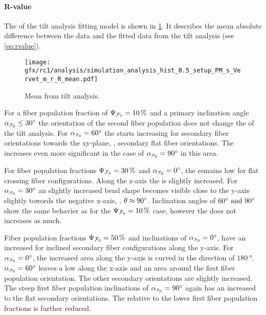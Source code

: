 \paragraph{R-value}
% 
The \rvalue{} of the tilt analysis fitting model is shown in \cref{fig:sim_ana_rvalue}.
It describes the mean absolute difference between the data and the fitted data from the tilt analysis (see \cref{eq:rvalue}).
\par
% 
\begin{figure}[!p]
\centering
\texttt{[image: gfx/rc1/analysis/simulation\_analysis\_hist\_0.5\_setup\_PM\_s\_Vervet\_m\_r\_R\_mean.pdf]}
\caption{Mean \rvalue{} from tilt analysis.}
\label{fig:sim_ana_rvalue}
\end{figure}
%
For a fiber population fraction of $\textnormal{$\Psi_{\textnormal{$\mathcal{F}_0$}}$}=\SI{10}{\percent}$ and a primary inclination angle $\modelInc\leq\SI{30}{\degree}$ the orientation of the second fiber population does not change the \rvalue{} of the tilt analysis.
For $\modelInc=\SI{60}{\degree}$ the \rvalue{} starts increasing for secondary fiber orientations towards the xy-plane, \ie{}, secondary flat fiber orientations.
The \rvalue{} increases even more significant in the case of $\modelInc=\SI{90}{\degree}$ in this area. 
\par
% 
For fiber population fractions $\textnormal{$\Psi_{\textnormal{$\mathcal{F}_0$}}$}=\SI{30}{\percent}$ and $\modelInc=\SI{0}{\degree}$, the \rvalue{} remains low for flat crossing fiber configurations.
Along the z-axis the \rvalue{} is slightly increased.
For $\modelInc=\SI{30}{\degree}$ an slightly increased bend shape becomes visible close to the y-axis slightly towords the negative x-axis, \ie{}, $\textnormal{$\theta$} \approx \SI{90}{\degree}$.
Inclination angles of $\SIlist{60;90}{\degree}$ show the same behavier as for the $\textnormal{$\Psi_{\textnormal{$\mathcal{F}_0$}}$}=\SI{10}{\percent}$ case, however the \rvalue does not increases as much.
\par
%
Fiber population fractions $\textnormal{$\Psi_{\textnormal{$\mathcal{F}_0$}}$}=\SI{50}{\percent}$ and inclinations of $\modelInc=\SI{0}{\degree}$, have an increased \rvalue{} for inclined secondary fiber configurations along the y-axis.
For $\modelInc=\SI{0}{\degree}$, the increased area along the y-axis is curved in the direction of $\SI{180}{\degree}$.
$\modelInc=\SI{60}{\degree}$ leaves a low \rvalue{} along the x-axis and an area around the first fiber population orientation.
The other secondary orientations are slightly increased.
The steep first fiber population inclinations of $\modelInc=\SI{90}{\degree}$ again has an increased \rvalue{} to the flat secondary orientations.
The \rvalue{} relative to the lower first fiber population fractions is further reduced.
